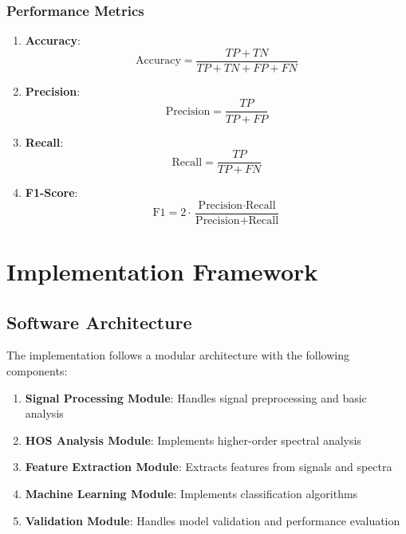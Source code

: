 \subsubsection{Performance Metrics}

\begin{enumerate}
    \item \textbf{Accuracy}:
    \begin{equation}
    \text{Accuracy} = \frac{TP + TN}{TP + TN + FP + FN}
    \end{equation}
    
    \item \textbf{Precision}:
    \begin{equation}
    \text{Precision} = \frac{TP}{TP + FP}
    \end{equation}
    
    \item \textbf{Recall}:
    \begin{equation}
    \text{Recall} = \frac{TP}{TP + FN}
    \end{equation}
    
    \item \textbf{F1-Score}:
    \begin{equation}
    \text{F1} = 2 \cdot \frac{\text{Precision} \cdot \text{Recall}}{\text{Precision} + \text{Recall}}
    \end{equation}
\end{enumerate}

\section{Implementation Framework}

\subsection{Software Architecture}

The implementation follows a modular architecture with the following components:

\begin{enumerate}
    \item \textbf{Signal Processing Module}: Handles signal preprocessing and basic analysis
    \item \textbf{HOS Analysis Module}: Implements higher-order spectral analysis
    \item \textbf{Feature Extraction Module}: Extracts features from signals and spectra
    \item \textbf{Machine Learning Module}: Implements classification algorithms
    \item \textbf{Validation Module}: Handles model validation and performance evaluation
\end{enumerate}

